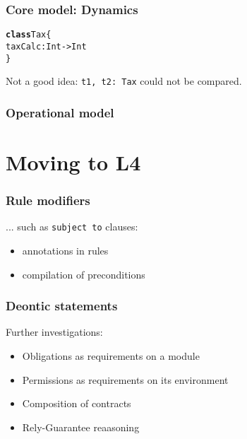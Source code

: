 \documentclass{beamer}
\begin{document}
\begin{frame}[fragile]\frametitle{Core model: Dynamics}

\begin{alltt}
\textbf{class} Tax \{
      taxCalc: Int -> Int
\}
\end{alltt}

Not a good idea: \texttt{t1, t2: Tax} could not be compared.

\end{frame}


\begin{frame}[fragile]\frametitle{Operational model}

\end{frame}



\section{Moving to L4}


\begin{frame}[fragile]\frametitle{Rule modifiers}

  ... such as \texttt{subject to} clauses:

  \begin{itemize}
  \item annotations in rules 
  \item compilation of preconditions
  \end{itemize}


\end{frame}


\begin{frame}[fragile]\frametitle{Deontic statements}

  Further investigations:

  \begin{itemize}
  \item Obligations as requirements on a module
  \item Permissions as requirements on its environment
  \item Composition of contracts
  \item Rely-Guarantee reaasoning
  \end{itemize}

\end{frame}
\end{document}

